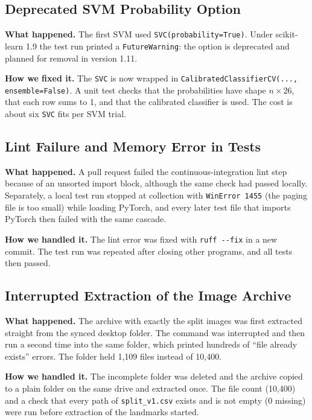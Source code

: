 \subsection{Deprecated SVM Probability Option}
\label{sec:challenge-svc-probability}

\textbf{What happened.} The first SVM used \texttt{SVC(probability=True)}. Under scikit-learn 1.9 the test run printed a \texttt{FutureWarning}: the option is deprecated and planned for removal in version 1.11.

\textbf{How we fixed it.} The \texttt{SVC} is now wrapped in \texttt{CalibratedClassifierCV(..., ensemble=False)}. A unit test checks that the probabilities have shape $n\times26$, that each row sums to 1, and that the calibrated classifier is used. The cost is about six \texttt{SVC} fits per SVM trial.

\subsection{Lint Failure and Memory Error in Tests}
\label{sec:challenge-lint-memory}

\textbf{What happened.} A pull request failed the continuous-integration lint step because of an unsorted import block, although the same check had passed locally. Separately, a local test run stopped at collection with \texttt{WinError 1455} (the paging file is too small) while loading PyTorch, and every later test file that imports PyTorch then failed with the same cascade.

\textbf{How we handled it.} The lint error was fixed with \texttt{ruff -{}-fix} in a new commit. The test run was repeated after closing other programs, and all tests then passed.

\subsection{Interrupted Extraction of the Image Archive}
\label{sec:challenge-interrupted-unzip}

\textbf{What happened.} The archive with exactly the split images was first extracted straight from the synced desktop folder. The command was interrupted and then run a second time into the same folder, which printed hundreds of ``file already exists'' errors. The folder held 1{,}109 files instead of 10{,}400.

\textbf{How we handled it.} The incomplete folder was deleted and the archive copied to a plain folder on the same drive and extracted once. The file count (10{,}400) and a check that every path of \texttt{split\_v1.csv} exists and is not empty (0 missing) were run before extraction of the landmarks started.

